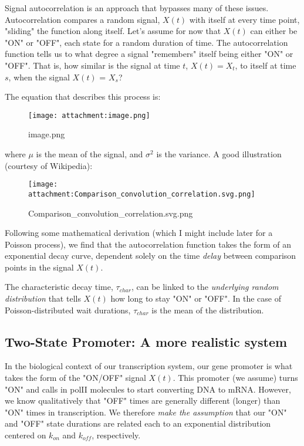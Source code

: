 \documentclass[11pt]{article}
\makeatletter
\def\maxwidth{\ifdim\Gin@nat@width>\linewidth\linewidth
    \else\Gin@nat@width\fi}
\let\Oldincludegraphics\includegraphics
\renewcommand{\includegraphics}[1]{\Oldincludegraphics[width=.8\maxwidth]{#1}}
\makeatother
\begin{document}
Signal autocorrelation is an approach that bypasses many of these
issues. Autocorrelation compares a random signal, \(X(t)\) with itself
at every time point, "sliding" the function along itself. Let's assume
for now that \(X(t)\) can either be "ON" or "OFF", each state for a
random duration of time. The autocorrelation function tells us to what
degree a signal "remembers" itself being either "ON" or "OFF". That is,
how similar is the signal at time \(t\), \(X(t) = X_t\), to itself at
time \(s\), when the signal \(X(t)\) = \(X_s\)?

The equation that describes this process is:

\begin{figure}
\centering
\texttt{[image: attachment:image.png]}
\caption{image.png}
\end{figure}

where \(\mu\) is the mean of the signal, and \(\sigma^2\) is the
variance. A good illustration (courtesy of Wikipedia):

\begin{figure}
\centering
\texttt{[image: attachment:Comparison\_convolution\_correlation.svg.png]}
\caption{Comparison\_convolution\_correlation.svg.png}
\end{figure}

Following some mathematical derivation (which I might include later for
a Poisson process), we find that the autocorrelation function takes the
form of an exponential decay curve, dependent solely on the time
\emph{delay} between comparison points in the signal \(X(t)\).

The characteristic decay time, \(\tau_{char}\), can be linked to the
\emph{underlying random distribution} that tells \(X(t)\) how long to
stay "ON" or "OFF". In the case of Poisson-distributed wait durations,
\(\tau_{char}\) is the mean of the distribution.

    \subsection{Two-State Promoter: A more realistic
system}\label{two-state-promoter-a-more-realistic-system}

In the biological context of our transcription system, our gene promoter
is what takes the form of the "ON/OFF" signal \(X(t)\). This promoter
(we assume) turns "ON" and calls in polII molecules to start converting
DNA to mRNA. However, we know qualitatively that "OFF" times are
generally different (longer) than "ON" times in transcription. We
therefore \emph{make the assumption} that our "ON" and "OFF" state
durations are related each to an exponential distribution centered on
\(k_{on}\) and \(k_{off}\), respectively.
\end{document}
